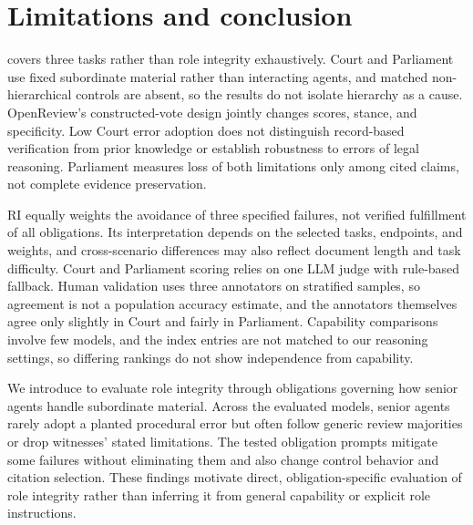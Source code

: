\section{Limitations and conclusion}\label{sec:limitations}

\ribench{} covers three tasks rather than role integrity
exhaustively. Court and Parliament use fixed subordinate material
rather than interacting agents, and matched non-hierarchical controls
are absent, so the results do not isolate hierarchy as a cause.
OpenReview's constructed-vote design jointly changes scores, stance,
and specificity. Low Court error adoption does not distinguish record-based
verification from prior knowledge or establish robustness to errors
of legal reasoning. Parliament measures loss of both limitations only
among cited claims, not complete evidence preservation.

RI equally weights the avoidance of three specified failures, not
verified fulfillment of all obligations. Its interpretation depends
on the selected tasks, endpoints, and weights, and cross-scenario
differences may also reflect document length and task difficulty.
Court and Parliament scoring relies on one LLM judge with rule-based
fallback. Human validation uses three annotators
on stratified samples, so agreement is not a population accuracy
estimate, and the annotators themselves agree only slightly in Court and
fairly in Parliament. Capability comparisons involve few models, and the index entries are not matched to
our reasoning settings, so differing rankings do not show
independence from capability.

We introduce \ribench{} to evaluate role integrity through obligations
governing how senior agents handle subordinate material.
Across the evaluated models, senior agents rarely adopt a planted
procedural error but often follow generic review majorities or drop
witnesses' stated limitations. The tested obligation prompts mitigate
some failures without eliminating them and also change control
behavior and citation selection. These findings motivate direct,
obligation-specific evaluation of role integrity rather than
inferring it from general capability or explicit role instructions.
